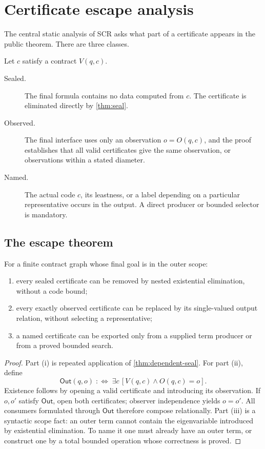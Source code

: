 \section{Certificate escape analysis}
\label{sec:escape}

The central static analysis of SCR asks what part of a certificate appears in
the public theorem.  There are three classes.

\begin{definition}
Let \(c\) satisfy a contract \(V(q,c)\).
\begin{description}
\item[Sealed.]  The final formula contains no data computed from \(c\).  The
certificate is eliminated directly by \cref{thm:seal}.
\item[Observed.]  The final interface uses only an observation
\(o=O(q,c)\), and the proof establishes that all valid certificates give the
same observation, or observations within a stated diameter.
\item[Named.]  The actual code \(c\), its leastness, or a label depending on a
particular representative occurs in the output.  A direct producer or bounded
selector is mandatory.
\end{description}
\end{definition}

\subsection{The escape theorem}

\begin{theorem}
\label{thm:escape}
For a finite contract graph whose final goal is in the outer scope:
\begin{enumerate}[label=(\roman*)]
\item every sealed certificate can be removed by nested existential
      elimination, without a code bound;
\item every exactly observed certificate can be replaced by its
      single-valued output relation, without selecting a representative;
\item a named certificate can be exported only from a supplied term producer
      or from a proved bounded search.
\end{enumerate}
\end{theorem}

\begin{proof}
Part (i) is repeated application of \cref{thm:dependent-seal}.  For part (ii),
define
\[
   \mathsf{Out}(q,o)\;:\!\Longleftrightarrow\;
      \exists c\,[V(q,c)\wedge O(q,c)=o].
\]
Existence follows by opening a valid certificate and introducing its
observation.  If \(o,o'\) satisfy \(\mathsf{Out}\), open both certificates;
observer independence yields \(o=o'\).  All consumers formulated through
\(\mathsf{Out}\) therefore compose relationally.  Part (iii) is a syntactic
scope fact: an outer term cannot contain the eigenvariable introduced by
existential elimination.  To name it one must already have an outer term, or
construct one by a total bounded operation whose correctness is proved.
\end{proof}

